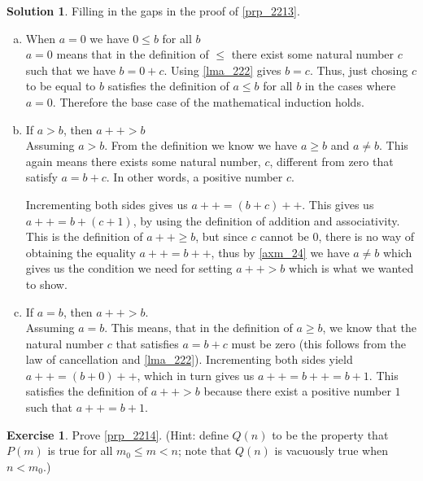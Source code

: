 \documentclass[a4paper, twocolumn]{report}
\newcounter{exercise} \numberwithin{exercise}{section}
\theoremstyle{definition}
\newtheorem{exc}[exercise]{Exercise}
\theoremstyle{solution}
\newtheorem*{sltn}{Solution}
\newcommand{\dplus}{{+}{+}} %
\begin{document}
\begin{sltn}
  Filling in the gaps in the proof of \ref{prp_2213}.
  \begin{enumerate}[(a)]
    \item When $a = 0$ we have $0 \leq b$ for all $b$\\
      [0.2cm]
      $a = 0$ means that in the definition of $\leq$ there exist some natural
      number $c$ such that we have $b = 0 + c$.  Using \ref{lma_222} gives $b =
      c$. Thus, just chosing $c$ to be equal to $b$ satisfies the definition of
      $a \leq b$ for all $b$ in the cases where $a = 0$. Therefore the base
      case of the mathematical induction holds.

    \item If $a > b$, then $a\dplus > b$\\
      [0.2cm]
      Assuming $a > b$. From the definition we know we have $a \geq b$ and $a
      \neq b$.  This again means there exists some natural number, $c$,
      different from zero that satisfy $a = b + c$. In other words, a positive
      number $c$.
      
      Incrementing both sides gives us $a\dplus = (b + c)\dplus$. This gives us
      $a\dplus = b + (c + 1)$, by using the definition of addition and
      associativity. This is the definition of $a\dplus \geq b$, but since $c$
      cannot be $0$, there is no way of obtaining the equality $a\dplus =
      b\dplus$, thus by \ref{axm_24} we have $a \neq b$ which gives us the
      condition we need for setting $a \dplus > b$ which is what we wanted to
      show.
      
    \item If $a = b$, then $a\dplus > b$.\\
      [0.2cm]
      Assuming $a = b$. This means, that in the definition of $a \geq b$, we
      know that the natural number $c$ that satisfies $a = b + c$ must be zero
      (this follows from the law of cancellation and \ref{lma_222}).
      Incrementing both sides yield $a\dplus = (b+0)\dplus$, which in turn
      gives us $a\dplus = b\dplus = b + 1$.  This satisfies the definition of
      $a\dplus > b$ because there exist a positive number $1$ such that
      $a\dplus = b + 1$.
  \end{enumerate}
\end{sltn}

\begin{exc}
  Prove \ref{prp_2214}. (Hint: define $Q(n)$ to be the property that $P(m)$ is
  true for all $m_0 \leq m < n$; note that $Q(n)$ is vacuously true when $n <
  m_0$.)
\end{exc}
\end{document}

